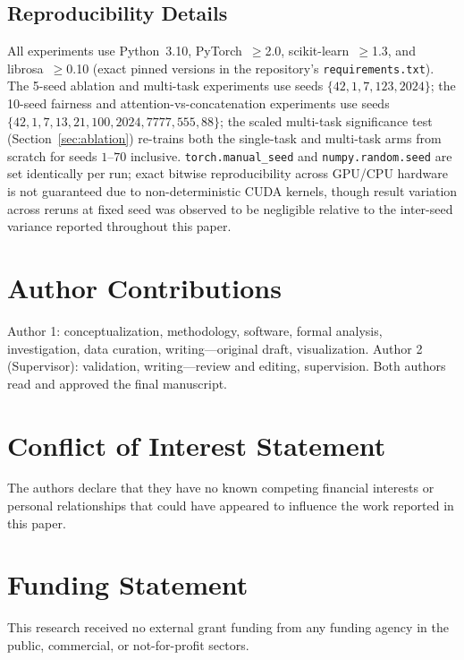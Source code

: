 \documentclass[journal]{IEEEtran}
\begin{document}
\subsection*{Reproducibility Details}
All experiments use Python~3.10, PyTorch~$\geq$2.0, scikit-learn~$\geq$1.3,
and librosa~$\geq$0.10 (exact pinned versions in the repository's
\texttt{requirements.txt}). The 5-seed ablation and multi-task
experiments use seeds $\{42, 1, 7, 123, 2024\}$; the 10-seed fairness
and attention-vs-concatenation experiments use seeds
$\{42,1,7,13,21,100,2024,7777,555,88\}$; the scaled multi-task
significance test (Section~\ref{sec:ablation}) re-trains both the
single-task and multi-task arms from scratch for seeds $1$--$70$
inclusive. \texttt{torch.manual\_seed}
and \texttt{numpy.random.seed} are set identically per run; exact
bitwise reproducibility across GPU/CPU hardware is not guaranteed
due to non-deterministic CUDA kernels, though result variation across
reruns at fixed seed was observed to be negligible relative to the
inter-seed variance reported throughout this paper.

\section*{Author Contributions}
Author 1: conceptualization, methodology, software, formal
analysis, investigation, data curation, writing---original draft,
visualization. Author 2 (Supervisor): validation, writing---review
and editing, supervision. Both authors read and approved the final
manuscript.

\section*{Conflict of Interest Statement}
The authors declare that they have no known competing financial
interests or personal relationships that could have appeared to
influence the work reported in this paper.

\section*{Funding Statement}
This research received no external grant funding from any
funding agency in the public, commercial, or not-for-profit
sectors.

\end{document}

